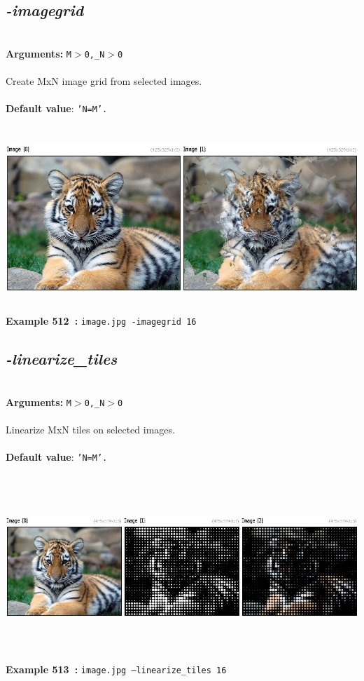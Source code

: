 \documentclass[a4paper,11pt,twoside]{book}
\begin{document}
\subsection{\emph{-imagegrid} }\vspace*{-0.5em}
~\\\textbf{Arguments: } 
{\small \texttt{M$>$0,\_N$>$0}}\\~\\
Create MxN image grid from selected images.
~\\~\\\textbf{Default value}: {\small \texttt{'N=M'.}}
\begin{center}\includegraphics[keepaspectratio=true,height=7cm,width=\textwidth]{img/gmic_def512.jpg}\\
{\footnotesize \textbf{Example 512~:} \texttt{image.jpg -imagegrid 16}}
\end{center}

\subsection{\emph{-linearize\_tiles} }\vspace*{-0.5em}
~\\\textbf{Arguments: } 
{\small \texttt{M$>$0,\_N$>$0}}\\~\\
Linearize MxN tiles on selected images.
~\\~\\\textbf{Default value}: {\small \texttt{'N=M'.}}
\begin{center}\includegraphics[keepaspectratio=true,height=7cm,width=\textwidth]{img/gmic_def513.jpg}\\
{\footnotesize \textbf{Example 513~:} \texttt{image.jpg --linearize\_tiles 16}}
\end{center}
\end{document}
